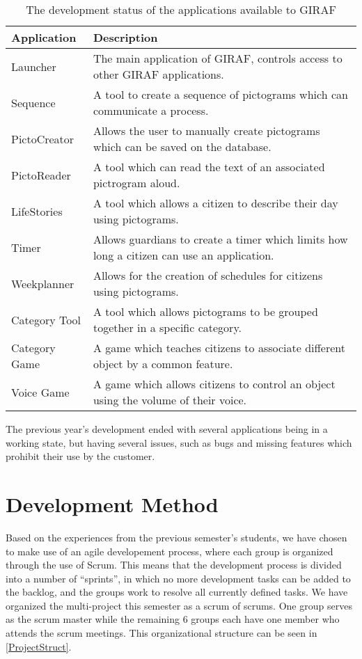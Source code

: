 \begin{table}[H]
\centering
\begin{tabular}{|p{2.8cm}|p{7cm}|}
\hline
Application			& Description \\\hline
Launcher  			& The main application of GIRAF, controls access
to other GIRAF applications. \\\hline 
Sequence	       	& A tool to create a sequence of pictograms which can
communicate a process.\\\hline 
PictoCreator  	   	& Allows the user to manually create pictograms
which can be saved on the database.\\\hline
PictoReader	   		& A tool which can read the text of an associated
pictrogram aloud.\\\hline
LifeStories	   		& A tool which allows a citizen to describe their day
using pictograms.\\\hline 
Timer     	   		& Allows guardians to create a timer which
limits how long a citizen can use an application.\\\hline 
Weekplanner 		& Allows for the creation of schedules for citizens
using pictograms. \\\hline 
Category Tool		& A tool which allows pictograms to be grouped together
in a specific category. \\\hline 
Category Game   	& A game which teaches citizens to associate
different object by a common feature. \\\hline 
Voice Game  		& A game which allows citizens to control an object
using the volume of their voice. \\\hline
\end{tabular} 
\caption{The development status of the applications available to GIRAF}
\label{GApps}
\end{table}

The previous year's development ended with several applications being in a
working state, but having several issues, such as bugs and missing features
which prohibit their use by the customer.

\section{Development Method}
Based on the experiences from the previous semester's students, we have chosen
to make use of an agile developement process, where each group is organized through
the use of Scrum. This means that the development process is divided into a
number of ``sprints'', in which no more development tasks can be added to the
backlog, and the groups work to resolve all currently defined tasks. We have
organized the multi-project this semester as a scrum of scrums. One group serves
as the scrum master while the remaining 6 groups each have one member who
attends the scrum meetings. This organizational structure can be seen in
\autoref{ProjectStruct}.

